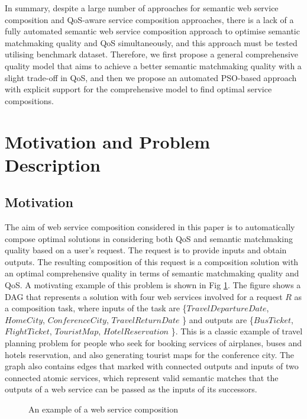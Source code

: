 \documentclass{llncs}
\begin{document}
In summary, despite a large number of approaches for semantic web service composition and QoS-aware service composition approaches, there is a lack of a fully automated semantic web service composition approach to optimise semantic matchmaking quality and QoS simultaneously, and this approach must be tested utilising benchmark dataset. Therefore, we first propose a general comprehensive quality model that aims to achieve a better semantic matchmaking quality with a slight trade-off in QoS, and then we propose an automated PSO-based approach with explicit support for the comprehensive model to find optimal service compositions.

\section{Motivation and Problem Description}\label{Motivation and Problem Description}
\subsection{Motivation}\label{Motivation}

The aim of web service composition considered in this paper is to automatically compose optimal solutions in considering both QoS and semantic matchmaking quality based on a user's request. The request is to provide inputs and obtain outputs. The resulting composition of this request is a composition solution with an optimal comprehensive quality in terms of semantic matchmaking quality and QoS. A motivating example of this problem is shown in Fig \ref{motivation}. The figure shows a DAG that represents a solution with four web services involved for a request $R$ as a composition task, where inputs of the task are \{$TravelDepartureDate$, $HomeCity$, $ConferenceCity$, $TravelReturnDate$ \} and outputs are \{$BusTicket$, $FlightTicket$, $TouristMap$, $HotelReservation$ \}. This is a classic example of travel planning problem for people who seek for booking services of airplanes, buses and hotels reservation, and also generating tourist maps for the conference city. The graph also contains edges that marked with connected outputs and inputs of two connected atomic services, which represent valid semantic matches that the outputs of a web service can be passed as the inputs of its successors.

\begin{figure}[h]
\centering
{}
 \caption{ An example of a web service composition}
 \label{motivation}
\end{figure}
\end{document}
